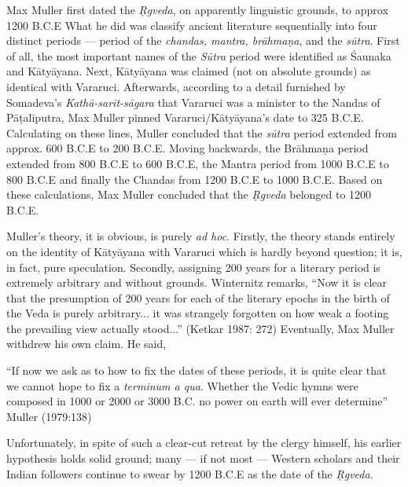 Max Muller first dated the {\sl Ṛgveda}, on apparently linguistic grounds, to approx 1200 B.C.E What he did was classify ancient literature sequentially into four distinct periods --- period of the {\sl chandas, mantra, brāhmaṇa}, and the {\sl sūtra}. First of all, the most important names of the {\sl Sūtra} period were identified as Śaunaka and Kātyāyana. Next, Kātyāyana was claimed (not on absolute grounds) as identical with Vararuci. Afterwards, according to a detail furnished by Somadeva’s {\sl Kathā-sarit-sāgara} that Vararuci was a minister to the Nandas of Pāṭalīputra, Max Muller pinned Vararuci/Kātyāyana’s date to 325 B.C.E. Calculating on these lines, Muller concluded that the {\sl sūtra} period extended from approx. 600 B.C.E to 200 B.C.E. Moving backwards, the Brāhmaṇa period extended from 800 B.C.E to 600 B.C.E, the Mantra period from 1000 B.C.E to 800 B.C.E and finally the Chandas from 1200 B.C.E to 1000 B.C.E. Based on these calculations, Max Muller concluded that the {\sl Ṛgveda} belonged to 1200 B.C.E.  

Muller’s theory, it is obvious, is purely {\sl ad hoc}. Firstly, the theory stands entirely on the identity of Kātyāyana with Vararuci which is hardly beyond question; it is, in fact, pure speculation. Secondly, assigning 200 years for a literary period is extremely arbitrary and without grounds. Winternitz remarks, “Now it is clear that the presumption of 200 years for each of the literary epochs in the birth of the Veda is purely arbitrary... it was strangely forgotten on how weak a footing the prevailing view actually stood...” (Ketkar 1987: 272) Eventually, Max Muller withdrew his own claim. He said,

\begin{myquote}
“If now we ask as to how to fix the dates of these periods, it is quite clear that we cannot hope to fix a {\sl terminum a qua}. Whether the Vedic hymns were composed in 1000 or 2000 or 3000 B.C. no power on earth will ever determine”
\hfill Muller (1979:138)
\end{myquote}


Unfortunately, in spite of such a clear-cut retreat by the clergy himself, his earlier hypothesis holds solid ground; many --- if not most --- Western scholars and their Indian followers continue to swear by 1200 B.C.E as the date of the {\sl Ṛgveda}. 


